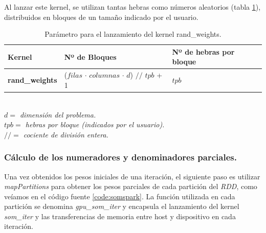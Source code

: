 Al lanzar este kernel, se utilizan tantas hebras como números aleatorios (tabla \ref{tab:randkernel}), distribuidos en bloques de un tamaño indicado por el usuario.
\begin{table}[ht]
\begin{tabular}{@{}lll@{}}
\toprule
\textbf{Kernel}        & \textbf{Nº de Bloques}                                 & \textbf{Nº de hebras por bloque}                                                                       \\ \midrule
\textbf{rand\_weights} & ($filas$ $\cdot$ $columnas$ $\cdot$ $d$) $//$ $tpb$ + 1 & $tpb$ \\ \bottomrule
\end{tabular}

\textit{\\$d=$ dimensión del problema.\\$tpb=$ hebras por bloque (indicados por el usuario).\\ $//=$ cociente de división entera.}
\caption{Parámetro para el lanzamiento del kernel rand\_weights.}
\label{tab:randkernel}
\end{table}

\subsubsection{Cálculo de los numeradores y denominadores parciales.}
Una vez obtenidos los pesos iniciales de una iteración, el siguiente paso es utilizar \textit{mapPartitions} para obtener los pesos parciales de cada partición del \textit{RDD}, como veíamos en el código fuente \ref{code:somspark}. La función utilizada en cada partición se denomina \textit{gpu\_som\_iter} y encapsula el lanzamiento del kernel \textit{som\_iter} y las transferencias de memoria entre host y dispositivo en cada iteración.

